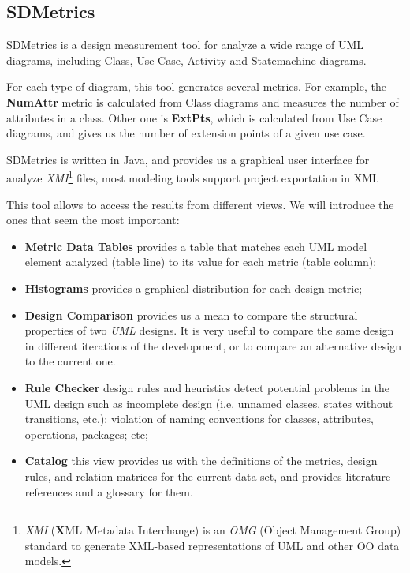 \subsection{SDMetrics}
SDMetrics is a design measurement tool for analyze a wide range of UML diagrams, including Class, Use Case, Activity and Statemachine diagrams.

For each type of diagram, this tool generates several metrics.
For example, the \textbf{NumAttr} metric is calculated from Class diagrams and measures the number of attributes in a class.
Other one is \textbf{ExtPts}, which is calculated from Use Case diagrams, and gives us the number of extension points of a given use case.

SDMetrics is written in \textsf{Java}, and provides us a graphical user interface for analyze \textit{XMI}\footnote{
\textit{XMI} (\textbf{X}ML \textbf{M}etadata \textbf{I}nterchange)  is an \textit{OMG} (Object Management Group) standard to generate XML-based representations of UML and other OO data models.} 
files, most modeling tools support project exportation in XMI.

This tool allows to access the results from different views. We will introduce the ones that seem the most important:
\begin{itemize}
\item \textbf{Metric Data Tables} provides a table that matches each UML model element analyzed (table line) to its value for each metric (table column);
\item \textbf{Histograms} provides a graphical distribution  for each design metric;
\item \textbf{Design Comparison} provides us a mean to compare the structural properties of two \textit{UML} designs. It is very useful to compare the same design in different iterations of the development, or to compare an alternative design to the current one.
\item \textbf{Rule Checker} design rules and heuristics detect potential problems in the UML design such as incomplete design (i.e. unnamed classes, states without transitions, etc.);  violation of naming conventions for classes, attributes, operations, packages; etc;

\item \textbf{Catalog} this view provides us with the definitions of the metrics, design rules, and relation matrices for the current data set, and provides literature references and a glossary for them.
\end{itemize}

